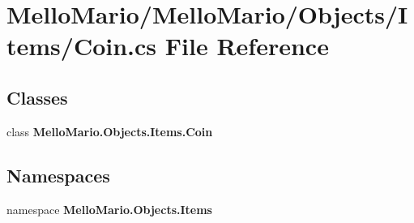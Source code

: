 \section{Mello\+Mario/\+Mello\+Mario/\+Objects/\+Items/\+Coin.cs File Reference}
\label{Coin_8cs}
\subsection*{Classes}
\begin{DoxyCompactItemize}
\item 
class \textbf{ Mello\+Mario.\+Objects.\+Items.\+Coin}
\end{DoxyCompactItemize}
\subsection*{Namespaces}
\begin{DoxyCompactItemize}
\item 
namespace \textbf{ Mello\+Mario.\+Objects.\+Items}
\end{DoxyCompactItemize}
